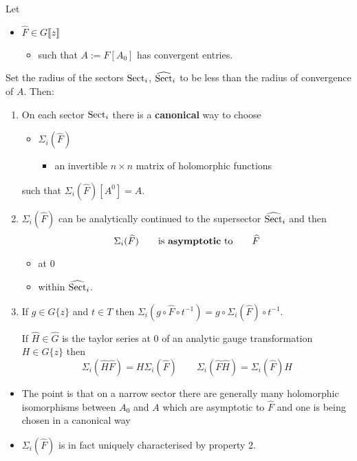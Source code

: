\begin{thm}
  Let
  \begin{itemize}
    \item $\hat{F}\in G\llbracket z\rrbracket$
      \begin{itemize}
        \item such that $A:=F[A_0]$ has convergent entries.
      \end{itemize}
  \end{itemize}
  Set the radius of the sectors $\Sect_i$, $\widehat\Sect_i$ to be less than
  the radius of convergence of $A$.
  Then:
  \begin{enumerate}
    \item On each sector $\Sect_i$ there is a \textbf{canonical} way to choose
      \begin{itemize}
        \item $\Sigma_i(\hat F)$
          \begin{itemize}
            \item an invertible $n\times n$ matrix of holomorphic functions
          \end{itemize}
      \end{itemize}
      such that $\Sigma_i(\hat F)[A^0]=A$.
    \item $\Sigma_i(\hat F)$ can be analytically continued to the supersector
      $\widehat\Sect_i$ and then
      \[
        \Sigma_i(\hat F)
        \qquad\text{is \textbf{asymptotic} to}\qquad
        \hat F
      \]
      \begin{itemize}
        \item at $0$
        \item within $\widehat\Sect_i$.
      \end{itemize}
    \item If $g\in G\{z\}$ and $t\in T$ then
      $\Sigma_i(g\circ\hat F \circ t^{-1})=g\circ\Sigma_i(\hat F)\circ t^{-1}$.
      \begin{prop}
        If $\hat H\in\hat G$ is the taylor series at $0$ of an analytic gauge
        transformation $H\in G\{z\}$ then
        \[
          \Sigma_i(\hat H \hat F)=H\Sigma_i(\hat F)
          \qquad
          \Sigma_i(\hat F \hat H)=\Sigma_i(\hat F)H
        \]
      \end{prop}
  \end{enumerate}
  \begin{rem}
    \begin{itemize}
      \item The point is that on a narrow sector there are generally many
        holomorphic isomorphisms between $A_0$ and $A$ which are asymptotic to
        $\hat F$ and one is being chosen in a canonical way
      \item $\Sigma_i(\hat F)$ is in fact uniquely characterised by property 2.
    \end{itemize}
  \end{rem}
\end{thm}

